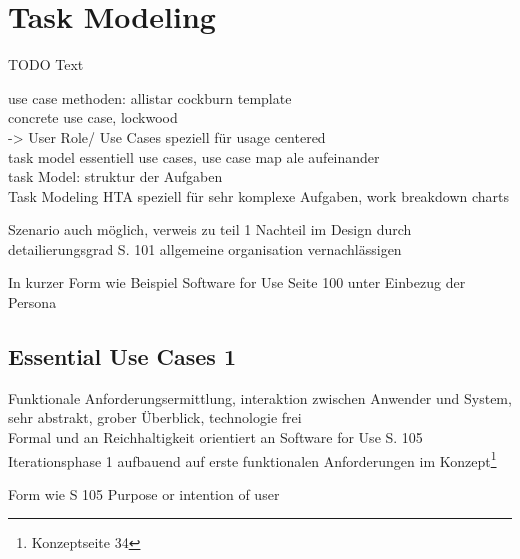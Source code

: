 
\section{Task Modeling}
TODO
Text

use case methoden: allistar cockburn template \\
concrete use case, lockwood\\


-> User Role/ Use Cases speziell für usage centered   \\
task model essentiell use cases, use case map ale aufeinander\\

task Model: struktur der Aufgaben\\

Task Modeling HTA speziell für sehr komplexe Aufgaben, work breakdown charts

Szenario auch möglich, verweis zu teil 1
Nachteil im Design durch detailierungsgrad S. 101 allgemeine organisation vernachlässigen

In kurzer Form wie Beispiel Software for Use Seite 100 unter Einbezug der Persona

\newpage

\subsection{Essential Use Cases 1 }
Funktionale Anforderungsermittlung, interaktion zwischen Anwender und System, sehr abstrakt, grober Überblick, technologie frei\\
Formal und an Reichhaltigkeit orientiert an Software for Use S. 105
Iterationsphase 1 aufbauend auf erste funktionalen Anforderungen im Konzept\footnote{Konzeptseite 34}

Form wie S 105 Purpose or intention of user


